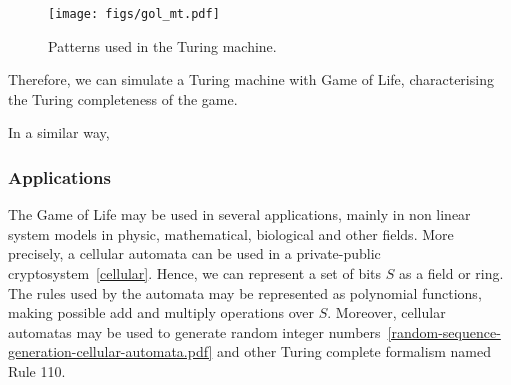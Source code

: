 \documentclass[12pt]{article}
\begin{document}

\begin{figure}[h]
    \centering
    \texttt{[image: figs/gol\_mt.pdf]}
    \caption{Patterns used in the Turing machine.}
    \label{fig:gol_mt}
\end{figure}

Therefore, we can simulate a Turing machine with Game of Life, characterising the Turing completeness of the game.

In a similar way, 


\subsubsection{Applications}

The Game of Life may be used in several applications, mainly in non linear system models in physic, mathematical, biological and other fields. More precisely, a cellular automata can be used in a private-public cryptosystem~\ref{cellular}. Hence, we can represent a set of bits $S$ as a field or ring. The rules used by the automata may be represented as polynomial functions, making possible add and multiply operations over $S$. Moreover, cellular automatas may be used to generate random integer numbers~\ref{random-sequence-generation-cellular-automata.pdf} and other Turing complete formalism named Rule 110.

\end{document}
